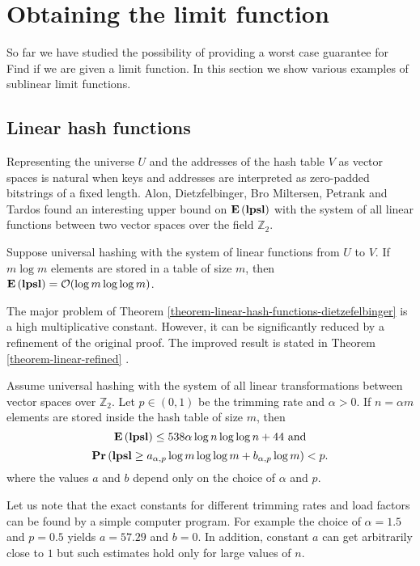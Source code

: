 \section{Obtaining the limit function}
\label{section-limit}

So far we have studied the possibility of providing a worst case guarantee for Find if we are given a limit function. 
In this section we show various examples of sublinear limit functions.

\subsection{Linear hash functions}
Representing the universe $U$ and the addresses of the hash table $V$ as vector spaces is natural when keys and addresses are interpreted as zero-padded  bitstrings of a fixed length. Alon, Dietzfelbinger, Bro Miltersen, Petrank and Tardos\cite{DBLP:journals/jacm/AlonDMPT99} found an interesting upper bound on $\mathbf{E}\left(\mathbf{lpsl}\right)$ with the system of all linear functions between two vector spaces over the field $\mathbb{Z}_2$.

\begin{theorem}
\label{theorem-linear-hash-functions-dietzefelbinger}
Suppose universal hashing with the system of linear functions from $U$ to $V$. 
If $m \log m$ elements are stored in a table of size $m$, then $\mathbf{E}\left(\mathbf{lpsl}\right) = \mathcal{O}(\log m \log \log m)$. 
\end{theorem}

The major problem of Theorem \ref{theorem-linear-hash-functions-dietzefelbinger} is a high multiplicative constant. However, it can be significantly reduced by a refinement of the original proof. The improved result is stated in Theorem \ref{theorem-linear-refined} \cite{babka-mt}.

\begin{theorem}
\label{theorem-linear-refined}
Assume universal hashing with the system of all linear transformations between vector spaces over $\mathbb{Z}_2$. 
Let $p \in (0, 1)$ be the trimming rate and $\alpha > 0$. 
If $n = \alpha m$ elements are stored inside the hash table of size $m$, then $$\mathbf{E}\left(\mathbf{lpsl}\right) \leq 538 \alpha \log n \log \log n + 44\mbox{ and}$$ $$\mathbf{Pr}\left(\mathbf{lpsl} \geq a_{\alpha, p} \log m \log \log m + b_{\alpha, p}\log m\right) < p.$$ where the values $a$ and $b$ depend only on the choice of $\alpha$ and $p$.
\end{theorem}

Let us note that the exact constants for different trimming rates and load factors can be found by a simple computer program.
For example the choice of $\alpha = 1.5$ and $p = 0.5$ yields $a = 57.29$ and $b = 0$.
In addition, constant $a$ can get arbitrarily close to $1$ but such estimates hold only for large values of $n$.


